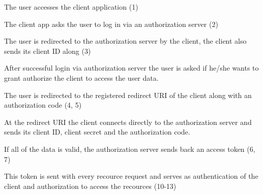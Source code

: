 \begin{DoxyItemize}
\item \-The user accesses the client application (1)
\item \-The client app asks the user to log in via an authorization server (2)
\item \-The user is redirected to the authorization server by the client, the client also sends its client \-I\-D along (3)
\item \-After successful login via authorization server the user is asked if he/she wants to grant authorize the client to access the user data.\par
 \-The user is redirected to the registered redirect \-U\-R\-I of the client along with an authorization code (4, 5)
\item \-At the redirect \-U\-R\-I the client connects directly to the authorization server and sends its client \-I\-D, client secret and the authorization code.\par
 \-If all of the data is valid, the authorization server sends back an access token (6, 7)
\item \-This token is sent with every recource request and serves as authentication of the client and authorization to access the recources (10-\/13)
\end{DoxyItemize}

